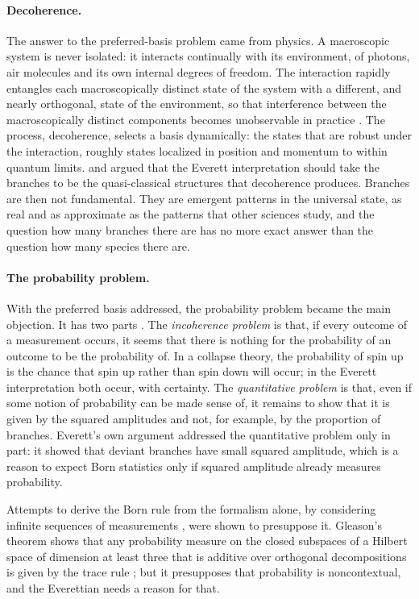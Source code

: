 \documentclass{situationist-preprint}
\begin{document}
\paragraph{Decoherence.} The answer to the preferred-basis problem came from physics. A macroscopic system is never isolated: it interacts continually with its environment, of photons, air molecules and its own internal degrees of freedom. The interaction rapidly entangles each macroscopically distinct state of the system with a different, and nearly orthogonal, state of the environment, so that interference between the macroscopically distinct components becomes unobservable in practice \citep{Zurek2003}. The process, decoherence, selects a basis dynamically: the states that are robust under the interaction, roughly states localized in position and momentum to within quantum limits. \citet{Saunders1993} and \citet{Wallace2003a} argued that the Everett interpretation should take the branches to be the quasi-classical structures that decoherence produces. Branches are then not fundamental. They are emergent patterns in the universal state, as real and as approximate as the patterns that other sciences study, and the question how many branches there are has no more exact answer than the question how many species there are.

\paragraph{The probability problem.} With the preferred basis addressed, the probability problem became the main objection. It has two parts \citep{Greaves2007}. The \emph{incoherence problem} is that, if every outcome of a measurement occurs, it seems that there is nothing for the probability of an outcome to be the probability of. In a collapse theory, the probability of spin up is the chance that spin up rather than spin down will occur; in the Everett interpretation both occur, with certainty. The \emph{quantitative problem} is that, even if some notion of probability can be made sense of, it remains to show that it is given by the squared amplitudes and not, for example, by the proportion of branches. Everett's own argument addressed the quantitative problem only in part: it showed that deviant branches have small squared amplitude, which is a reason to expect Born statistics only if squared amplitude already measures probability.

Attempts to derive the Born rule from the formalism alone, by considering infinite sequences of measurements \citep{Hartle1968}, were shown to presuppose it. Gleason's theorem shows that any probability measure on the closed subspaces of a Hilbert space of dimension at least three that is additive over orthogonal decompositions is given by the trace rule \citep{Gleason1957}; but it presupposes that probability is noncontextual, and the Everettian needs a reason for that.
\end{document}
